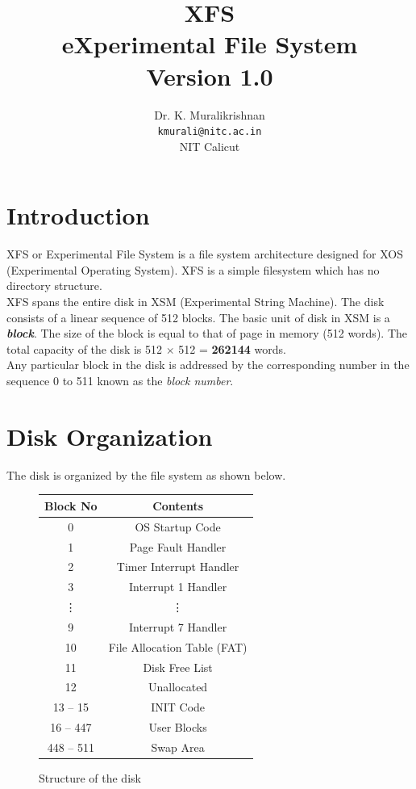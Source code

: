 \documentclass[11pt]{article}
\title{XFS \\ eXperimental File System \\
Version 1.0}
\author{Dr. K. Muralikrishnan  \\ \texttt{kmurali@nitc.ac.in} \\ {NIT Calicut} }
\begin{document}
\maketitle
\pagebreak

\thispagestyle{plain}

\tableofcontents
\pagebreak




\section{Introduction}

XFS or Experimental File System is a file system architecture designed for XOS (Experimental Operating System). XFS is a simple filesystem which has no directory structure. \\

XFS spans the entire disk in XSM (Experimental String Machine). The disk consists of a linear sequence of 512 blocks. The basic unit of disk in XSM is a \textbf{\textit{block}}. The size of the block is equal to that of page in memory (512 words). The total capacity of the disk is 512 $\times$ 512  = \textbf{262144} words. \\

 Any particular block in the disk is addressed by the corresponding number in the sequence 0 to 511 known as the \emph{block number}. 


\section{Disk Organization}
The disk is organized by the file system as shown below. 

\begin{figure}[htp!] \small
	\centering
	\begin{tabular}{|c|c|}
	\toprule
		\textbf{Block No} & \textbf{Contents} \\ \hline
	\toprule
		0 & OS Startup Code \\ \hline
		1 & Page Fault Handler \\ \hline
		2 & Timer Interrupt Handler \\ \hline
		3 & Interrupt 1 Handler\\ 
		\vdots & \vdots \\ 
		9 & Interrupt 7 Handler\\ \hline
		10 & File Allocation Table (FAT) \\ \hline
		11 & Disk Free List \\ \hline
		12 & Unallocated  \\ \hline
		13 -- 15 & INIT Code  \\ \hline
		16 -- 447 & User Blocks  \\ \hline
		448 -- 511 & Swap Area  \\ \hline					
	\end{tabular}
	\caption{Structure of the disk}
	\label{fig:disk}
\end{figure}
\end{document}
